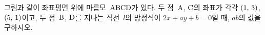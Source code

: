 \noindent\begin{minipage}[t]{0.58\linewidth}\vspace{0pt}\raggedright 그림과 같이 좌표평면 위에 마름모~$\mathrm{ABCD}$가 있다. 두 점~$\mathrm{A}$, $\mathrm{C}$의 좌표가 각각 $(1,\mkern3mu 3)$, $(5,\mkern3mu 1)$이고, 두 점~$\mathrm{B}$, $\mathrm{D}$를 지나는 직선~$l$의 방정식이 $2x+ay+b=0$일 때, $ab$의 값을 구하시오. \end{minipage}\hfill\begin{minipage}[t]{0.4\linewidth}\vspace{0pt}\centering \resizebox{\ifdim\width>\linewidth\linewidth\else\width\fi}{!}{}\end{minipage}\par
